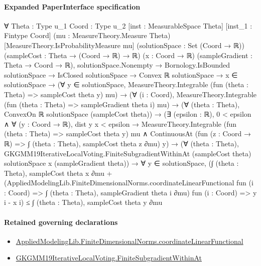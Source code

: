 \documentclass[10pt]{article}
\begin{document}
\paragraph{Expanded PaperInterface specification}
\begin{ReviewVerbatim}
∀ {Theta : Type u_1} {Coord : Type u_2} [inst : MeasurableSpace Theta] [inst_1 : Fintype Coord]
  (mu : MeasureTheory.Measure Theta) [MeasureTheory.IsProbabilityMeasure mu] (solutionSpace : Set (Coord → ℝ))
  (sampleCost : Theta → (Coord → ℝ) → ℝ) (x : Coord → ℝ) (sampleGradient : Theta → Coord → ℝ),
  solutionSpace.Nonempty →
    Bornology.IsBounded solutionSpace →
      IsClosed solutionSpace →
        Convex ℝ solutionSpace →
          x ∈ solutionSpace →
            (∀ y ∈ solutionSpace, MeasureTheory.Integrable (fun (theta : Theta) => sampleCost theta y) mu) →
              (∀ (i : Coord), MeasureTheory.Integrable (fun (theta : Theta) => sampleGradient theta i) mu) →
                (∀ (theta : Theta), ConvexOn ℝ solutionSpace (sampleCost theta)) →
                  (∃ (epsilon : ℝ),
                      0 < epsilon ∧
                        ∀ (y : Coord → ℝ),
                          dist y x < epsilon →
                            MeasureTheory.Integrable (fun (theta : Theta) => sampleCost theta y) mu ∧
                              ContinuousAt (fun (z : Coord → ℝ) => ∫ (theta : Theta), sampleCost theta z ∂mu) y) →
                    (∀ (theta : Theta),
                        GKGMM19IterativeLocalVoting.FiniteSubgradientWithinAt (sampleCost theta) solutionSpace x
                          (sampleGradient theta)) →
                      ∀ y ∈ solutionSpace,
                        (∫ (theta : Theta), sampleCost theta x ∂mu +
                            (AppliedModelingLib.FiniteDimensionalNorms.coordinateLinearFunctional fun (i : Coord) =>
                                ∫ (theta : Theta), sampleGradient theta i ∂mu)
                              fun (i : Coord) => y i - x i) ≤
                          ∫ (theta : Theta), sampleCost theta y ∂mu
\end{ReviewVerbatim}

\paragraph{Retained governing declarations}
\begin{itemize}\raggedright
\item \hyperlink{governing-declaration-76e30f898cb62445}{Applied\allowbreak{}Modeling\allowbreak{}Lib.\allowbreak{}Finite\allowbreak{}Dimensional\allowbreak{}Norms.\allowbreak{}coordinate\allowbreak{}Linear\allowbreak{}Functional}
\item \hyperlink{governing-declaration-299655269609640a}{GKGMM19\allowbreak{}Iterative\allowbreak{}Local\allowbreak{}Voting.\allowbreak{}Finite\allowbreak{}Subgradient\allowbreak{}Within\allowbreak{}At}
\end{itemize}
\end{document}
